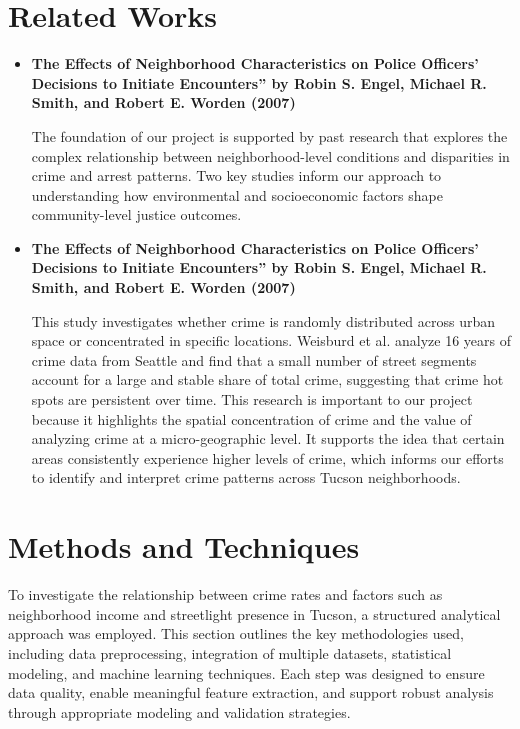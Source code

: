 \documentclass{report}
\begin{document}
\section{Related Works}

\begin{itemize}
\item \textbf{The Effects of Neighborhood Characteristics on Police Officers’ Decisions to Initiate Encounters” by Robin S. Engel, Michael R. Smith, and Robert E. Worden (2007)} \cite{welsh08}
  \par The foundation of our project is supported by past research that explores the complex relationship between neighborhood-level conditions and disparities in crime and arrest patterns. Two key studies inform our approach to understanding how environmental and socioeconomic factors shape community-level justice outcomes.
  
\item \textbf{The Effects of Neighborhood Characteristics on Police Officers’ Decisions to Initiate Encounters” by Robin S. Engel, Michael R. Smith, and Robert E. Worden (2007)} \cite{jr07}
  \par This study investigates whether crime is randomly distributed across urban space or concentrated in specific locations. Weisburd et al. analyze 16 years of crime data from Seattle and find that a small number of street segments account for a large and stable share of total crime, suggesting that crime hot spots are persistent over time. This research is important to our project because it highlights the spatial concentration of crime and the value of analyzing crime at a micro-geographic level. It supports the idea that certain areas consistently experience higher levels of crime, which informs our efforts to identify and interpret crime patterns across Tucson neighborhoods.
  \par 
\end{itemize}


\newpage
\section{Methods and Techniques}

\par To investigate the relationship between crime rates and factors such as neighborhood income and streetlight presence in Tucson, a structured analytical approach was employed. This section outlines the key methodologies used, including data preprocessing, integration of multiple datasets, statistical modeling, and machine learning techniques. Each step was designed to ensure data quality, enable meaningful feature extraction, and support robust analysis through appropriate modeling and validation strategies.
\end{document}
